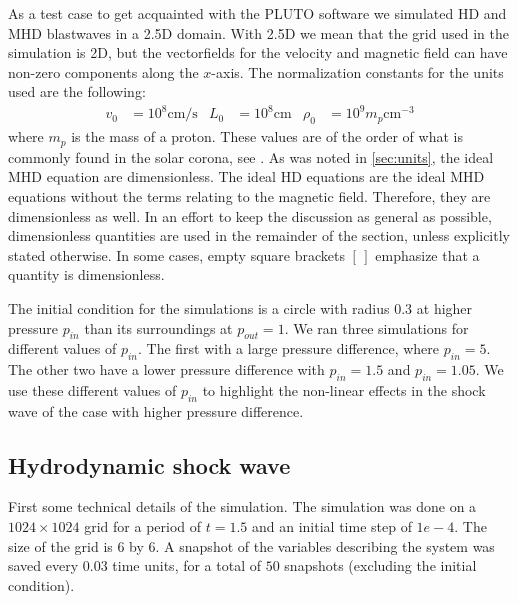 As a test case to get acquainted with the PLUTO software we simulated HD and MHD blastwaves in a 2.5D domain.
With 2.5D we mean that the grid used in the simulation is 2D, but the vectorfields for the velocity and magnetic field can have non-zero components along the $x$-axis.
The normalization constants for the units used are the following:
\begin{align*}
	v_0 &= 10^8 \text{cm/s}
	    &L_0 &= 10^8 \text{cm}
	    &\rho_0 &= 10^9 m_p \text{cm}^{-3}
\end{align*}
where $m_p$ is the mass of a proton. These values are of the order of what is commonly found in the solar corona, see \cite{article2}.
As was noted in \cref{sec:units}, the ideal MHD equation are dimensionless.
The ideal HD equations are the ideal MHD equations without the terms relating to the magnetic field. Therefore, they are dimensionless as well.
In an effort to keep the discussion as general as possible, dimensionless quantities are used in the remainder of the section, unless explicitly stated otherwise.
In some cases, empty square brackets $[\,]$ emphasize that a quantity is dimensionless.

The initial condition for the simulations is a circle with radius $0.3$ at higher pressure $p_{in}$ than its surroundings at $p_{out} = 1$.
We ran three simulations for different values of $p_{in}$.
The first with a large pressure difference, where $p_{in} = 5$. The other two have a lower pressure difference with $p_{in} = 1.5$ and  $p_{in}=1.05$.
We use these different values of $p_{in}$ to highlight the non-linear effects in the shock wave of the case with higher pressure difference.

\subsection{Hydrodynamic shock wave}
First some technical details of the simulation.
The simulation was done on a $1024 \times 1024$ grid for a period of $t=1.5$ and an initial time step of $1e-4$.
The size of the grid is $6$ by $6$.
A snapshot of the variables describing the system was saved every $0.03$ time units, for a total of $50$ snapshots (excluding the initial condition).

